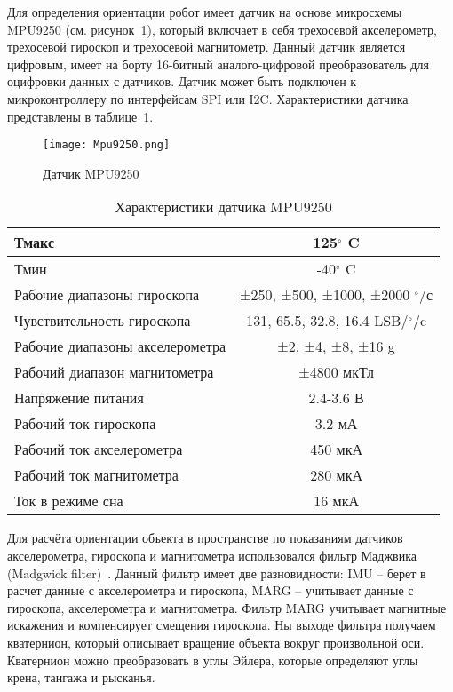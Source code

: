 Для определения ориентации робот имеет датчик на основе микросхемы MPU9250 (см. рисунок~\ref{Mpu9250}), который включает в себя трехосевой акселерометр, трехосевой гироскоп и трехосевой магнитометр. Данный датчик является цифровым, имеет на борту 16-битный аналого-цифровой преобразователь для оцифровки данных с датчиков. Датчик может быть подключен к микроконтроллеру по интерфейсам SPI или I2C. Характеристики датчика представлены в таблице~\ref{tabMpu}.

\begin{figure}[h]
	\centering
	\texttt{[image: Mpu9250.png]}%
	\caption{Датчик MPU9250}
	\label{Mpu9250}
\end{figure}

\begin{table}[h]
	\centering
	\caption{Характеристики датчика MPU9250}\label{tabMpu}
	\begin{tabular}{|l|c|}
		\hline
		Тмакс	&	125$^\circ$ C 	\\ \hline
		Тмин 	&	-40$^\circ$ C \\ \hline
		Рабочие диапазоны гироскопа & ±250, ±500, ±1000, ±2000 $^\circ$/с \\ \hline
		Чувствительность гироскопа & 131, 65.5, 32.8, 16.4 LSB/$^\circ$/c \\ \hline
		Рабочие диапазоны акселерометра & ±2, ±4, ±8, ±16 g\\ \hline
		Рабочий диапазон магнитометра & ±4800 мкТл\\ \hline
		Напряжение питания & 2.4-3.6 В\\ \hline
		Рабочий ток гироскопа & 3.2 мА\\ \hline
		Рабочий ток акселерометра & 450 мкА\\ \hline
		Рабочий ток магнитометра & 280 мкА\\ \hline
		Ток в режиме сна & 16 мкА \\ \hline
	\end{tabular}
\end{table}

Для расчёта ориентации объекта в пространстве по показаниям датчиков акселерометра, гироскопа и магнитометра использовался фильтр Маджвика (Madgwick filter)~\cite{Madgwick}. Данный фильтр имеет две разновидности: IMU -- берет в  расчет данные с акселерометра и гироскопа, MARG -- учитывает данные с гироскопа, акселерометра и магнитометра. Фильтр MARG учитывает магнитные искажения и компенсирует смещения гироскопа. Ны выходе фильтра получаем кватернион, который описывает вращение объекта вокруг произвольной оси. Кватернион можно преобразовать в углы Эйлера, которые определяют углы крена, тангажа и рысканья. 

